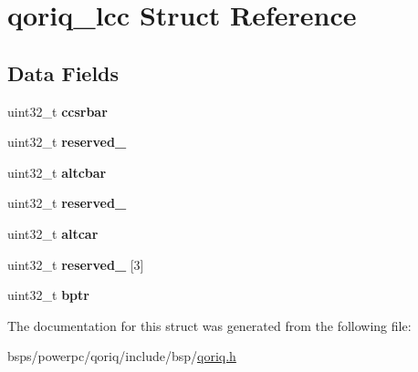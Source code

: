 \hypertarget{structqoriq__lcc}{}\section{qoriq\+\_\+lcc Struct Reference}
\label{structqoriq__lcc}
\subsection*{Data Fields}
\begin{DoxyCompactItemize}
\item 
\mbox{\label{structqoriq__lcc_aaf19b9c243257e4b337b2eb0aed3db96}} 
uint32\+\_\+t {\bfseries ccsrbar}
\item 
\mbox{\label{structqoriq__lcc_a8d31a1c69564ce4f35b3c15e96e72a62}} 
uint32\+\_\+t {\bfseries reserved\+\_}
\item 
\mbox{\label{structqoriq__lcc_a3725660e79efedbba2a88de3e6371c35}} 
uint32\+\_\+t {\bfseries altcbar}
\item 
\mbox{\label{structqoriq__lcc_a3fae11a8239996fe1705cd6e45dc504c}} 
uint32\+\_\+t {\bfseries reserved\+\_}
\item 
\mbox{\label{structqoriq__lcc_a20498b456b2472ef7a5c0c5d822936e8}} 
uint32\+\_\+t {\bfseries altcar}
\item 
\mbox{\label{structqoriq__lcc_aeae825ef86f91ee76c385c795dae0d98}} 
uint32\+\_\+t {\bfseries reserved\+\_} \mbox{[}3\mbox{]}
\item 
\mbox{\label{structqoriq__lcc_a6f59d8e7bbd6c3ba49ddfffc04812af3}} 
uint32\+\_\+t {\bfseries bptr}
\end{DoxyCompactItemize}


The documentation for this struct was generated from the following file\+:\begin{DoxyCompactItemize}
\item 
bsps/powerpc/qoriq/include/bsp/\mbox{\hyperlink{qoriq_8h}{qoriq.\+h}}\end{DoxyCompactItemize}

